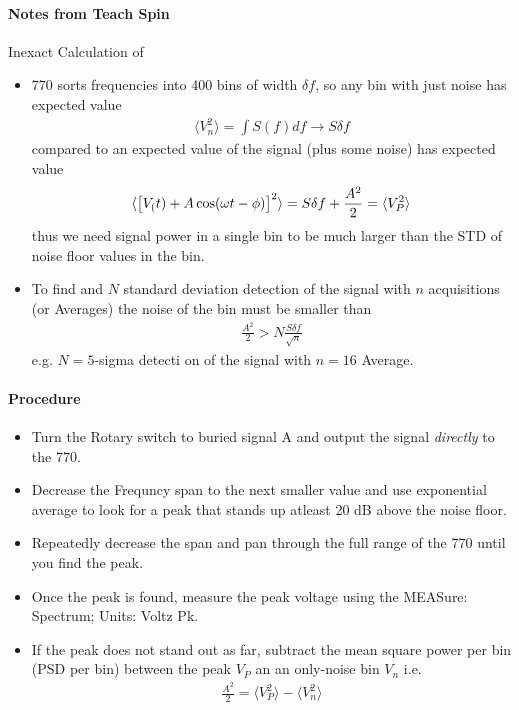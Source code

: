 \documentclass[../main.tex]{subfiles}
\begin{document}
\paragraph*{Notes from Teach Spin} Inexact Calculation of 
\begin{itemize}
    \item 770 sorts frequencies into 400 bins of width $\delta f$, so any bin with just noise has expected value
    \begin{align*}
        \langle V_n^2 \rangle = \int S(f) df \to S \delta f
    \end{align*}
    compared to an expected value of the signal (plus some noise) has expected value
    \begin{align*}
        \langle \qt[V_(t) + A \cos(\omega t -\phi)]^2 \rangle = S \delta f + \frac{A^2}{2} = \langle V_P^2 \rangle
    \end{align*}
    thus we need signal power in a single bin to be much larger than the STD of noise floor values in the bin. 
    \item To find and $N$ standard deviation detection of the signal with $n$ acquisitions (or Averages) the noise of the bin must be smaller than
    \begin{align*}
        \frac{A^2}{2} > N \frac{S \delta f}{\sqrt{n}}
    \end{align*}
    e.g. $N = 5$-sigma detecti on of the signal with $n = 16$ Average. 
\end{itemize}

\paragraph*{Procedure}
\begin{itemize}
    \item Turn the Rotary switch to buried signal A and output the signal \textit{directly} to the 770.
    \item Decrease the Frequncy span to the next smaller value and use exponential average to look for a peak that stands up atleast 20 dB above the noise floor.
    \item Repeatedly decrease the span and pan through the full range of the 770 until you find the peak. 
    \item Once the peak is found, measure the peak voltage using the MEASure: Spectrum; Units: Voltz Pk.
    \item If the peak does not stand out as far, subtract the mean square power per bin (PSD per bin) between the peak $V_P$ an an only-noise bin $V_n$ i.e.
    \begin{align*}
        \frac{A^2}{2} = \langle V_P^2 \rangle - \langle V_n^2 \rangle
    \end{align*}
\end{itemize}
\end{document}
